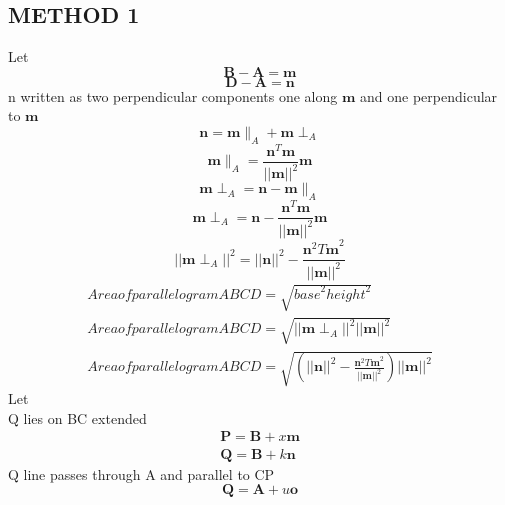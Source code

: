 \documentclass[journal,10pt,twocolumn]{article}
\begin{document}
\subsection*{METHOD 1}

Let 
\begin{equation}
\boldsymbol{B-A} = \boldsymbol{m}
\end{equation}
\begin{equation}
\boldsymbol{D-A} = \boldsymbol{n} 
\end{equation}
n written as two perpendicular components one along $\boldsymbol{m}$ and one perpendicular to $\boldsymbol{m}$
\begin{equation}
   \boldsymbol{n}=\boldsymbol{m} \parallel_A +\boldsymbol{m} \perp_A
\end{equation}
\begin{equation}
\boldsymbol{m} \parallel_A ={\frac{\boldsymbol{n}^T\boldsymbol{m}}{||\boldsymbol{m}||^2}}\boldsymbol{m}
\end{equation}
\begin{equation}
\boldsymbol{m} \perp_A =\boldsymbol{n} - \boldsymbol{m} \parallel_A
\end{equation}
\begin{equation}
\boldsymbol{m} \perp_A=\boldsymbol{n}-{\frac{\boldsymbol{n}^T\boldsymbol{m}}{||\boldsymbol{m}||^2}}\boldsymbol{m}
\end{equation}
\begin{equation}
||\boldsymbol{m} \perp_A||^2=||\boldsymbol{n}||^2-{\frac{{\boldsymbol{n}^2T\boldsymbol{m}}^2}{||\boldsymbol{m}||^2}}
\end{equation}
\begin{eqnarray}
    Area of parallelogram ABCD =\sqrt{{base}^2{height}^2}\\
    Area of parallelogram ABCD =\sqrt{{||\boldsymbol{m} \perp_A}||^2{||\boldsymbol{m}||^2}}\\
    Area of parallelogram ABCD =\sqrt{(||\boldsymbol{n}||^2-{\frac{{\boldsymbol{n}^2T\boldsymbol{m}}^2}{||\boldsymbol{m}||^2}})||\boldsymbol{m}||^2}
\end{eqnarray}
Let\\
Q lies on BC extended
\begin{eqnarray}
    \boldsymbol{P}=\boldsymbol{B}+x\boldsymbol{m}\\
    \boldsymbol{Q}=\boldsymbol{B}+k\boldsymbol{n}
\end{eqnarray}
Q line passes through A and parallel to CP
\begin{equation}
    \boldsymbol{Q}=\boldsymbol{A}+u\boldsymbol{o}
\end{equation}
\end{document}
